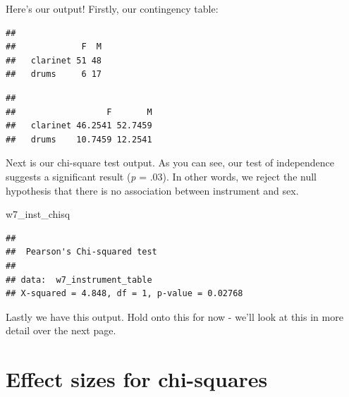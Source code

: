 \documentclass[
]{book}
\newenvironment{Shaded}{\begin{snugshade}}{\end{snugshade}}
\newcommand{\AttributeTok}[1]{\textcolor[rgb]{0.13,0.29,0.53}{#1}}
\newcommand{\ConstantTok}[1]{\textcolor[rgb]{0.56,0.35,0.01}{#1}}
\newcommand{\FunctionTok}[1]{\textcolor[rgb]{0.13,0.29,0.53}{\textbf{#1}}}
\newcommand{\NormalTok}[1]{#1}
\newcommand{\OtherTok}[1]{\textcolor[rgb]{0.56,0.35,0.01}{#1}}
\newcommand{\SpecialCharTok}[1]{\textcolor[rgb]{0.81,0.36,0.00}{\textbf{#1}}}
\begin{document}
Here's our output! Firstly, our contingency table:

\begin{Shaded}
\end{Shaded}

\begin{verbatim}
##           
##             F  M
##   clarinet 51 48
##   drums     6 17
\end{verbatim}

\begin{Shaded}
\end{Shaded}

\begin{verbatim}
##           
##                  F       M
##   clarinet 46.2541 52.7459
##   drums    10.7459 12.2541
\end{verbatim}

Next is our chi-square test output. As you can see, our test of independence suggests a significant result (\emph{p} = .03). In other words, we reject the null hypothesis that there is no association between instrument and sex.

\begin{Shaded}
\begin{Highlighting}[]
\NormalTok{w7\_inst\_chisq}
\end{Highlighting}
\end{Shaded}

\begin{verbatim}
## 
##  Pearson's Chi-squared test
## 
## data:  w7_instrument_table
## X-squared = 4.848, df = 1, p-value = 0.02768
\end{verbatim}

Lastly we have this output. Hold onto this for now - we'll look at this in more detail over the next page.

\section{Effect sizes for chi-squares}\label{effect-sizes-for-chi-squares}
\end{document}
